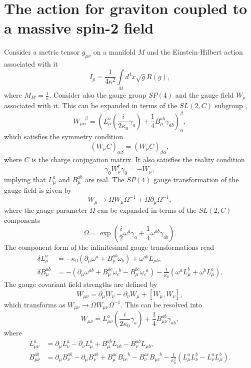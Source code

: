 \documentclass[a4paper,12pt]{article}
\begin{document}
\section{The action for graviton coupled to a massive spin-2 field}

Consider a metric tensor $g_{\mu\nu}$ on a manifold $M$ and the
Einstein-Hilbert action associated with it%
\[
I_{g}=\frac{1}{4\kappa^{2}}\int\limits_{M}d^{4}x\sqrt{g}R\left(  g\right)  ,
\]
where $M_{Pl}=\frac{1}{\kappa}.$ Consider also the gauge group $SP(4)$ and the
gauge field $W_{\mu}$ associated with it. This can be expanded in terms of the
$SL(2,C)$ subgroup \cite{ch}, \cite{css}%
\[
W_{\mu\alpha}^{\quad\beta}=\left(  L_{\mu}^{a}\left(  \frac{i}{2\kappa_{0}%
}\gamma_{a}\right)  +\frac{1}{4}B_{\mu}^{ab}\gamma_{ab}\right)  _{\alpha
}^{\beta},
\]
which satisfies the symmetry condition
\[
\left(  W_{\mu}C\right)  _{\alpha\beta}=\left(  W_{\mu}C\right)  _{\beta
\alpha},
\]
where $C$ is the charge conjugation matrix. It also satisfies the reality
condition
\[
\gamma_{0}W_{\mu}^{\dagger}\gamma_{0}=-W_{\mu},
\]
implying that $L_{\mu}^{a}$ and $B_{\mu}^{ab}$ are real. The $SP(4)$ gauge
transformation of the gauge field is given by
\[
W_{\mu}\rightarrow\Omega W_{\mu}\Omega^{-1}+\Omega\partial_{\mu}\Omega^{-1},
\]
where the gauge parameter $\Omega$ can be expanded in terms of the $SL(2,C)$
components%
\[
\Omega=\exp\left(  \frac{i}{2}\omega^{a}\gamma_{a}+\frac{1}{4}\omega
^{ab}\gamma_{ab}\right)  .
\]
The component form of the infinitesimal gauge transformations read
\begin{align*}
\delta L_{\mu}^{a} &  =-\kappa_{0}\left(  \partial_{\mu}\omega^{a}+B_{\mu
}^{ab}\omega_{b}\right)  +\omega^{ab}L_{\mu b},\\
\delta B_{\mu}^{ab} &  =-\left(  \partial_{\mu}\omega^{ab}+B_{\mu}^{ac}%
\omega_{c}^{\,\,b}-B_{\mu}^{bc}\omega_{c}^{\,\,a}\right)  -\frac{1}{\kappa
_{0}}\left(  \omega^{a}L_{\mu}^{b}+\omega^{b}L_{\mu}^{a}\right)  .
\end{align*}
The gauge covariant field strengths are defined by%
\[
W_{\mu\nu}=\partial_{\mu}W_{\nu}-\partial_{\nu}W_{\mu}+\left[  W_{\mu},W_{\nu
}\right]  ,
\]
which transforms as $W_{\mu\nu}\rightarrow\Omega W_{\mu\nu}\Omega^{-1}.$ This
can be resolved into%
\[
W_{\mu\nu}=L_{\mu\nu}^{a}\left(  \frac{i}{2\kappa_{0}}\gamma_{a}\right)
+\frac{1}{4}B_{\mu\nu}^{ab}\gamma_{ab},
\]
where
\begin{align*}
L_{\mu\nu}^{a} &  =\partial_{\mu}L_{\nu}^{a}-\partial_{\nu}L_{\mu}^{a}+B_{\mu
}^{ab}L_{\nu b}-B_{\nu}^{ab}L_{\mu b},\\
B_{\mu\nu}^{ab} &  =\partial_{\mu}B_{\nu}^{ab}-\partial_{\mu}B_{\nu}%
^{ab}+B_{\mu}^{ac}B_{\nu c}^{\quad b}-B_{\nu}^{ac}B_{\mu c}^{\quad b}-\frac
{1}{\kappa_{0}^{2}}\left(  L_{\mu}^{a}L_{\nu}^{b}-L_{\nu}^{a}L_{\mu}%
^{b}\right)  .
\end{align*}
\end{document}
